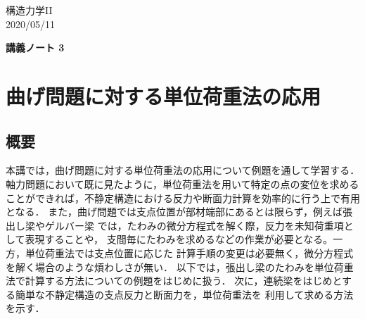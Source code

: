 ﻿\documentclass[10pt,a4j]{jarticle}
\newlength{\minitwocolumn}
\begin{document}
\newcommand{\fat}[1]{\mbox{\boldmath $#1$}}
\newcommand{\D}{\partial}
\newcommand{\w}{\omega}
\newcommand{\ga}{\alpha}
\newcommand{\gb}{\beta}
\newcommand{\gx}{\xi}
\newcommand{\gz}{\zeta}
\newcommand{\vhat}[1]{\hat{\fat{#1}}}
\newcommand{\spc}{\vspace{0.7\baselineskip}}
\newcommand{\halfspc}{\vspace{0.3\baselineskip}}

\newcommand{\twofig}[2]
 {
   \begin{figure}
     \begin{minipage}[t]{\minitwocolumn}
         \begin{center}   #1
         \end{center}
     \end{minipage}
         \hspace{\columnsep}
     \begin{minipage}[t]{\minitwocolumn}
         \begin{center} #2
         \end{center}
     \end{minipage}
   \end{figure}
 }
\begin{flushright}
	構造力学II\\
	2020/05/11
\end{flushright}
\begin{center}
	{\LARGE \bf 講義ノート 3} \\
\end{center}
\setcounter{section}{2}
\section{曲げ問題に対する単位荷重法の応用}
\subsection{概要}
本講では，曲げ問題に対する単位荷重法の応用について例題を通して学習する．
軸力問題において既に見たように，単位荷重法を用いて特定の点の変位を求める
ことができれば，不静定構造における反力や断面力計算を効率的に行う上で有用となる．
また，曲げ問題では支点位置が部材端部にあるとは限らず，例えば張出し梁やゲルバー梁
では，たわみの微分方程式を解く際，反力を未知荷重項として表現することや，
支間毎にたわみを求めるなどの作業が必要となる。一方，単位荷重法では支点位置に応じた
計算手順の変更は必要無く，微分方程式を解く場合のような煩わしさが無い．
以下では，張出し梁のたわみを単位荷重法で計算する方法についての例題をはじめに扱う．
次に，連続梁をはじめとする簡単な不静定構造の支点反力と断面力を，単位荷重法を
利用して求める方法を示す．
\end{document}
